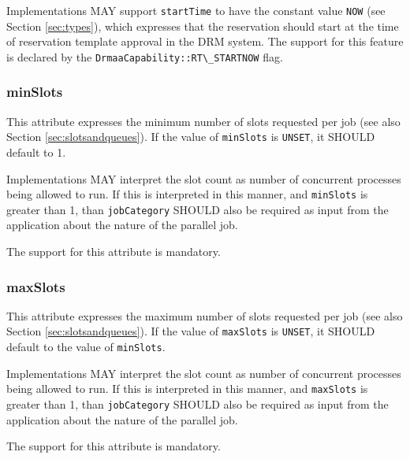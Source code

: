 \documentclass{article}
\newcommand{\h}[1]{\lstinline|#1|}
\newcommand{\rat}[1]{}
\begin{document}
Implementations MAY support \h{startTime} to have the constant value \h{NOW} (see Section \ref{sec:types}), which expresses that the reservation should start at the time of reservation template approval in the DRM system. The support for this feature is declared by the \h{DrmaaCapability::RT\_STARTNOW} flag. 

\subsubsection{minSlots}

This attribute expresses the minimum number of slots requested per job (see also Section \ref{sec:slotsandqueues}). If the value of \h{minSlots} is \h{UNSET}, it SHOULD default to 1.

Implementations MAY interpret the slot count as number of concurrent processes being allowed to run. If this is interpreted in this manner, and \h{minSlots} is greater than 1, than \h{jobCategory} SHOULD also be required as input from the application about the nature of the parallel job.

The support for this attribute is mandatory.

\rat{The hint regarding number of concurrent processes intentionally does not speak about processes per host - this would create semantics for our opaque slot concept.}

\subsubsection{maxSlots}

This attribute expresses the maximum number of slots requested per job (see also Section \ref{sec:slotsandqueues}). If the value of \h{maxSlots} is \h{UNSET}, it SHOULD default to the value of \h{minSlots}.

Implementations MAY interpret the slot count as number of concurrent processes being allowed to run. If this is interpreted in this manner, and \h{maxSlots} is greater than 1, than \h{jobCategory} SHOULD also be required as input from the application about the nature of the parallel job.

The support for this attribute is mandatory.

\rat{Conf call June 29th 2011: For maxSlots > 1, the demand for a job category is intentionally only MAY. This is reasoned by the fact that in most DRM systems,  advance reservation is a concept that is independent to the jobs that are later used in this reservation. So you are just requesting just some container, and you do not have to specify at this moment what kind of jobs do you want to run using this reservation (e.g. OpenMP, OpenMPI, MPICH). However, some systems need that information, so we leave it to the implementation how to deal with that.
}
\end{document}
